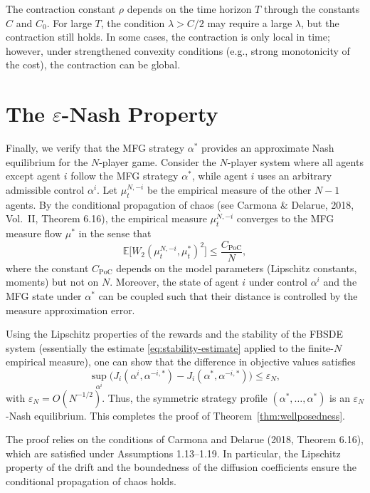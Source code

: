 \begin{remark}
The contraction constant $\rho$ depends on the time horizon $T$ through the constants
$C$ and $C_0$. For large $T$, the condition $\lambda > C/2$ may require a large
$\lambda$, but the contraction still holds. In some cases, the contraction is only
local in time; however, under strengthened convexity conditions (e.g., strong
monotonicity of the cost), the contraction can be global.
\end{remark}


\section{The $\varepsilon$-Nash Property}
\label{sec:wp-nash}

Finally, we verify that the MFG strategy $\alpha^*$ provides an approximate Nash
equilibrium for the $N$-player game. Consider the $N$-player system where all agents
except agent $i$ follow the MFG strategy $\alpha^*$, while agent $i$ uses an arbitrary
admissible control $\alpha^i$. Let $\mu_t^{N,-i}$ be the empirical measure of the other
$N-1$ agents. By the conditional propagation of chaos (see Carmona \& Delarue, 2018,
Vol.\ II, Theorem 6.16), the empirical measure $\mu_t^{N,-i}$ converges to the MFG
measure flow $\mu^*$ in the sense that
\[
    \mathbb{E}\big[W_2(\mu_t^{N,-i}, \mu_t^*)^2\big] \leq \frac{C_{\mathrm{PoC}}}{N},
\]
where the constant $C_{\mathrm{PoC}}$ depends on the model parameters (Lipschitz
constants, moments) but not on $N$. Moreover, the state of agent $i$ under control
$\alpha^i$ and the MFG state under $\alpha^*$ can be coupled such that their distance
is controlled by the measure approximation error.

Using the Lipschitz properties of the rewards and the stability of the FBSDE system
(essentially the estimate \eqref{eq:stability-estimate} applied to the finite-$N$
empirical measure), one can show that the difference in objective values satisfies
\[
    \sup_{\alpha^i} \big( J_i(\alpha^i, \alpha^{-i,*}) - J_i(\alpha^*, \alpha^{-i,*})
    \big) \leq \varepsilon_N,
\]
with $\varepsilon_N = O(N^{-1/2})$. Thus, the symmetric strategy profile
$(\alpha^*, \dots, \alpha^*)$ is an $\varepsilon_N$-Nash equilibrium. This completes
the proof of Theorem~\ref{thm:wellposedness}.

\begin{remark}
The proof relies on the conditions of Carmona and Delarue (2018, Theorem 6.16), which
are satisfied under Assumptions 1.13--1.19. In particular, the Lipschitz property of
the drift and the boundedness of the diffusion coefficients ensure the conditional
propagation of chaos holds.
\end{remark}


